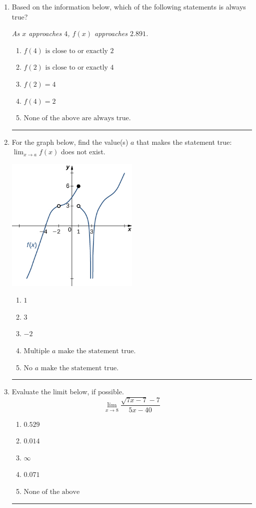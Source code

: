 \documentclass[14pt]{extbook}
\newcommand{\litem}[1]{\item#1\hspace*{-1cm}\rule{\textwidth}{0.4pt}}
\begin{document}
\begin{enumerate}
{\begin{enumerate}[label=\Alph*.]
\end{enumerate} }
\litem{
Based on the information below, which of the following statements is always true?
\begin{center}
    \textit{ As $x$ approaches $4$, $f(x)$ approaches $2.891$. }
\end{center}
\begin{enumerate}[label=\Alph*.]
\item \( f(4) \text{ is close to or exactly } 2 \)
\item \( f(2) \text{ is close to or exactly } 4 \)
\item \( f(2) = 4 \)
\item \( f(4) = 2 \)
\item \( \text{None of the above are always true.} \)

\end{enumerate} }
\litem{
For the graph below, find the value(s) $a$ that makes the statement true: $ \displaystyle \lim_{x \rightarrow a} f(x)$ does not exist.
\begin{center}
    \includegraphics[width=0.5\textwidth]{../Figures/evaluateLimitGraphicallyB.png}
\end{center}
\begin{enumerate}[label=\Alph*.]
\item \( 1 \)
\item \( 3 \)
\item \( -2 \)
\item \( \text{Multiple } a \text{ make the statement true}. \)
\item \( \text{No } a \text{ make the statement true}. \)

\end{enumerate} }
\litem{
Evaluate the limit below, if possible.\[ \lim_{x \rightarrow 8} \frac{\sqrt{7x - 7} - 7}{5x - 40} \]\begin{enumerate}[label=\Alph*.]
\item \( 0.529 \)
\item \( 0.014 \)
\item \( \infty \)
\item \( 0.071 \)
\item \( \text{None of the above} \)


\end{enumerate}}
\end{enumerate}
\end{document}
